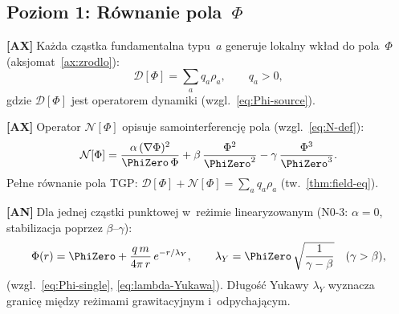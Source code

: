\subsection{Poziom 1: R\'ownanie pola~$\Phi$}%
\label{app:H-pole}

\begin{chain}\label{chain:A3}
  \textbf{[AX]}$\;$Ka\.zda cz\k{a}stka fundamentalna typu~$a$
  generuje lokalny wk\l{}ad do pola~$\Phi$ (aksjomat~\ref{ax:zrodlo}):
  \begin{equation}\label{eq:H-source}
    \mathcal{D}[\Phi] = \sum_a q_a \rho_a,
    \qquad
    q_a > 0,
  \end{equation}
  gdzie $\mathcal{D}[\Phi]$ jest operatorem dynamiki (wzgl.~\eqref{eq:Phi-source}).
\end{chain}

\begin{chain}\label{chain:A4}
  \textbf{[AX]}$\;$Operator $\mathcal{N}[\Phi]$ opisuje
  samointerferencj\k{e} pola (wzgl.~\eqref{eq:N-def}):
  \begin{equation}\label{eq:H-N}
    \mathcal{N}[\Phi] =
      \frac{\alpha\,(\nabla\Phi)^2}{\PhiZero\,\Phi}
      + \beta\,\frac{\Phi^2}{\PhiZero^2}
      - \gamma\,\frac{\Phi^3}{\PhiZero^3}.
  \end{equation}
  Pe\l{}ne r\'ownanie pola TGP: $\mathcal{D}[\Phi] + \mathcal{N}[\Phi]
  = \sum_a q_a \rho_a$ (tw.~\ref{thm:field-eq}).
\end{chain}

\begin{chain}\label{chain:A5}
  \textbf{[AN]}$\;$Dla jednej cz\k{a}stki punktowej w~re\.zimie
  linearyzowanym (N0-3: $\alpha = 0$, stabilizacja poprzez
  $\beta$--$\gamma$):
  \begin{equation}\label{eq:H-Yukawa}
    \Phi(r) = \PhiZero + \frac{q\,m}{4\pi\,r}\,e^{-r/\lambda_Y},
    \qquad
    \lambda_Y = \PhiZero\,\sqrt{\frac{1}{\gamma - \beta}}
    \quad (\gamma > \beta),
  \end{equation}
  (wzgl.~\eqref{eq:Phi-single}, \eqref{eq:lambda-Yukawa}).
  D\l{}ugo\'s\'c Yukawy $\lambda_Y$ wyznacza granic\k{e} mi\k{e}dzy
  re\.zimami grawitacyjnym i~odpychaj\k{a}cym.
\end{chain}

